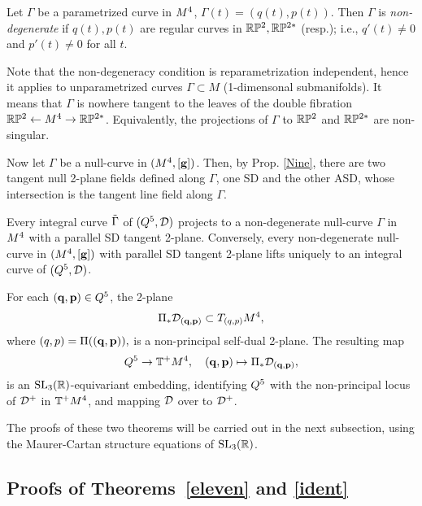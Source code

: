 \begin{definition}\label{ng}
Let $\Gamma$  be a parametrized curve in $M^4$,  $\Gamma(t)=(q(t),p(t)) $. 
Then  $\Gamma $ is  {\em non-degenerate} if $q(t),p(t)$ are regular curves in $\mathbb{R}\mathbb{P}^2, \mathbb{R}\mathbb{P}^{2*}$ (resp.); i.e., $q'(t)\neq 0$ and $ p'(t)\neq 0$ for all $t$. 
\end{definition}

Note that the non-degeneracy condition  is reparametrization independent, hence it applies to unparametrized curves $\Gamma\subset M$ (1-dimensonal submanifolds). It means that $\Gamma$ 
is nowhere tangent to the leaves of the double fibration $\mathbb{R}\mathbb{P}^2\leftarrow M^4\to\mathbb{R}\mathbb{P}^{2*}$.   
Equivalently, the projections of $\Gamma$ to $\mathbb{R}\mathbb{P}^2$ and $\mathbb{R}\mathbb{P}^{2*}$ are non-singular. 




 Now let $\Gamma$ be a null-curve in $ (M^4,[\mathbf{ g}])$. Then, by Prop. \ref{Nine}, there are two tangent null 2-plane fields defined along $\Gamma$, one SD and the other ASD, whose  intersection is the tangent line field along $\Gamma$. 
\begin{theorem}\label{eleven}
Every  integral curve $\tilde \Gamma$  of $(Q^5,{\mathcal D})$ projects to a non-degenerate  null-curve $\Gamma$  in  $M^4$ with a parallel SD tangent 2-plane. Conversely, every non-degenerate null-curve in $(M^4, [\mathbf{ g}])$ with parallel SD tangent 2-plane lifts uniquely to an  integral curve  of $(Q^5,{\mathcal D})$. \end{theorem}


\begin{theorem}\label{ident} For each $(\mathbf q,{\mathbf p})\in Q^5$, the 2-plane 
$$\Pi_*{\mathcal D}_{(\mathbf q,{\mathbf p})}\subset T_{(q,p)}M^4,$$
where $(q,p)=\Pi((\mathbf q, {\mathbf p})),$
is a non-principal self-dual 2-plane. The resulting map 
$$ Q^5\to \mathbb{T}^+M^4,\quad (\mathbf q,{\mathbf p})\mapsto \Pi_*{\mathcal D}_{(\mathbf q,{\mathbf p})},$$ is an  ${\mathrm{SL}_3(\mathbb{R})}$-equivariant  embedding, identifying    $Q^5$ with  the non-principal locus of ${\mathcal D}^+$ in $\mathbb{T}^+M^4$, and mapping ${\mathcal D}$ over to ${\mathcal D}^+$. 
\end{theorem}

The proofs of these two theorems will be carried out in the next subsection, using  the Maurer-Cartan structure equations of ${\mathrm{SL}_3(\mathbb{R})}$. 




\subsection{Proofs of Theorems~\ref{eleven} and \ref{ident}}\label{proofs}

